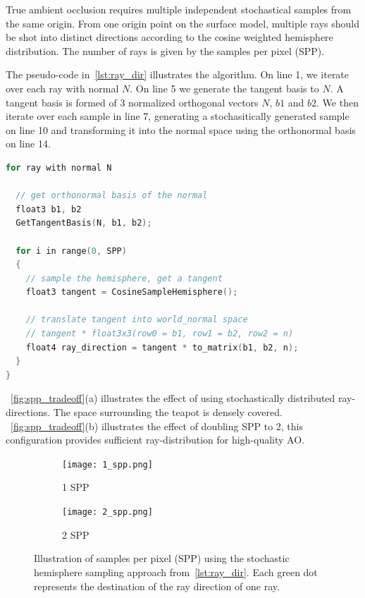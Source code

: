 True ambient occlusion requires multiple independent stochastical samples from the same origin. From one origin point on the surface model, multiple rays should be shot into distinct directions according to the cosine weighted hemisphere distribution. The number of rays is given by the samples per pixel (SPP).

The pseudo-code in~\autoref{lst:ray_dir} illustrates the algorithm.
On line 1, we iterate over each ray with normal $N$. On line 5 we generate the tangent basis to $N$. A tangent basis is formed of 3 normalized orthogonal vectors $N$, $b1$ and $b2$. We then iterate over each sample in line 7, generating a stochasitically generated sample on line 10 and transforming it into the normal space using the orthonormal basis on line 14.

\begin{lstlisting}[caption={Generation of the ray direction based on ray normal N},label={lst:ray_dir}, language=C++]
for ray with normal N

  // get orthonormal basis of the normal
  float3 b1, b2
  GetTangentBasis(N, b1, b2);
  
  for i in range(0, SPP) 
  {
    // sample the hemisphere, get a tangent
    float3 tangent = CosineSampleHemisphere();

    // translate tangent into world_normal space
    // tangent * float3x3(row0 = b1, row1 = b2, row2 = n)
    float4 ray_direction = tangent * to_matrix(b1, b2, n);
  }
}
\end{lstlisting}

~\autoref{fig:spp_tradeoff}(a) illustrates the effect of using stochastically distributed ray-directions. The space surrounding the teapot is densely covered. ~\autoref{fig:spp_tradeoff}(b) illustrates the effect of doubling SPP to 2, this configuration provides sufficient ray-distribution for high-quality AO.

\begin{figure}[htb]
  \begin{subfigure}{0.49\textwidth}
  \texttt{[image: 1\_spp.png]}
  \caption{1 SPP}
  \end{subfigure}
  \hspace*{\fill} %
  \begin{subfigure}{0.49\textwidth}
  \texttt{[image: 2\_spp.png]}
  \caption{2 SPP}
  \end{subfigure}
  \caption{\label{fig:spp_tradeoff}
           Illustration of samples per pixel (SPP) using the stochastic hemisphere sampling approach from~\autoref{lst:ray_dir}. Each green dot represents the destination of the ray direction of one ray.
           }
\end{figure}

